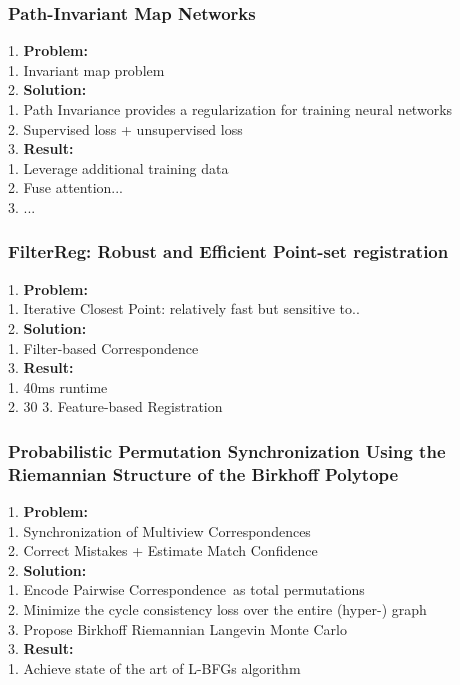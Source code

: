 \subsubsection{Path-Invariant Map Networks}
    1. {\bf Problem:} \\
        1. Invariant map problem \\
    2. {\bf Solution:} \\
        1. Path Invariance provides a regularization for training neural networks \\
        2. Supervised loss + unsupervised loss \\
    3. {\bf Result:} \\
        1. Leverage additional training data \\
        2. Fuse attention... \\
        3. ... \\
\subsubsection{FilterReg: Robust and Efficient Point-set registration}
    1. {\bf Problem:} \\
        1. Iterative Closest Point: relatively fast but sensitive to.. \\
    2. {\bf Solution:} \\
        1. Filter-based Correspondence \\
    3. {\bf Result:}  \\
        1. 40ms runtime \\
        2. 30%
        3. Feature-based Registration \\
\subsubsection{Probabilistic Permutation Synchronization Using the Riemannian Structure of the Birkhoff Polytope}
    1. {\bf Problem:} \\
        1. Synchronization of Multiview Correspondences \\
        2. Correct Mistakes + Estimate Match Confidence \\
    2. {\bf Solution:} \\
        1. Encode Pairwise Correspondence\ as total permutations \\
        2. Minimize the cycle consistency loss over the entire (hyper-) graph \\
        3. Propose Birkhoff Riemannian Langevin Monte Carlo \\
    3. {\bf Result:} \\
        1. Achieve state of the art of L-BFGs algorithm \\
